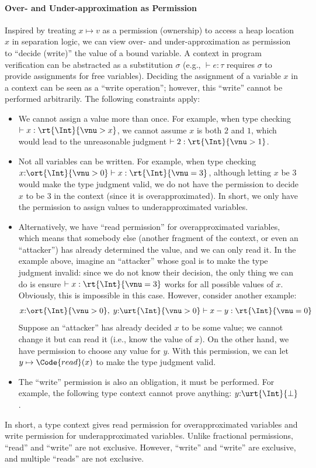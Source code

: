 \paragraph{Over- and Under-approximation as Permission} Inspired by treating $x \mapsto v$ as a permission (ownership) to access a heap location $x$ in separation logic, we can view over- and under-approximation as permission to ``decide (write)'' the value of a bound variable. A context in program verification can be abstracted as a substitution $\sigma$ (e.g., $\vdash e : \tau$ requires $\sigma$ to provide assignments for free variables). Deciding the assignment of a variable $x$ in a context can be seen as a ``write operation''; however, this ``write'' cannot be performed arbitrarily. The following constraints apply:
\begin{itemize}
    \item We cannot assign a value more than once. For example, when type checking $\vdash x : \rt{\Int}{\vnu > x}$, we cannot assume $x$ is both $2$ and $1$, which would lead to the unreasonable judgment $\vdash 2 : \rt{\Int}{\vnu > 1}$. 
    \item Not all variables can be written. For example, when type checking $x{:}\ort{\Int}{\vnu > 0} \vdash x : \rt{\Int}{\vnu = 3}$, although letting $x$ be $3$ would make the type judgment valid, we do not have the permission to decide $x$ to be $3$ in the context (since it is overapproximated). In short, we only have the permission to assign values to underapproximated variables.
    \item Alternatively, we have ``read permission'' for overapproximated variables, which means that somebody else (another fragment of the context, or even an ``attacker'') has already determined the value, and we can only read it. In the example above, imagine an ``attacker'' whose goal is to make the type judgment invalid: since we do not know their decision, the only thing we can do is ensure $\vdash x : \rt{\Int}{\vnu = 3}$ works for all possible values of $x$. Obviously, this is impossible in this case. However, consider another example:
    \begin{align*}
        x{:}\ort{\Int}{\vnu > 0},\; y{:}\urt{\Int}{\vnu > 0} \vdash x - y : \rt{\Int}{\vnu = 0}
    \end{align*}\noindent
    Suppose an ``attacker'' has already decided $x$ to be some value; we cannot change it but can read it (i.e., know the value of $x$). On the other hand, we have permission to choose any value for $y$. With this permission, we can let $y \mapsto \Code{read}(x)$ to make the type judgment valid.
    \item The ``write'' permission is also an obligation, it must be performed. For example, the following type context cannot prove anything: $y{:}\urt{\Int}{\bot}$.
\end{itemize}
In short, a type context gives read permission for overapproximated variables and write permission for underapproximated variables. Unlike fractional permissions, ``read'' and ``write'' are not exclusive. However, ``write'' and ``write'' are exclusive, and multiple ``reads'' are not exclusive.

